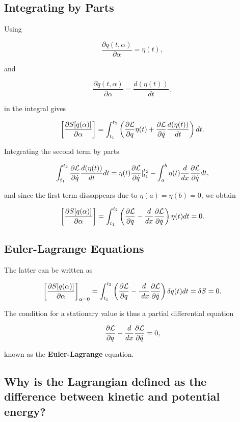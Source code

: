 \documentclass[%
oneside,                 %
final,                   %
10pt]{article}
\begin{document}
\subsection{Integrating by Parts}

Using

\[
\frac{\partial q(t,\alpha)}{\partial \alpha}=\eta(t),
\]

and

\[
\frac{\partial \dot{q}(t,\alpha)}{\partial \alpha}=\frac{d(\eta(t))}{dt},
\]

in the integral gives

\[
\left[\frac{\partial  S[q(\alpha)]}{\partial \alpha}\right]=\int_{t_1}^{t_2} \left( \frac{\partial {\cal L}}{\partial q}\eta(t)+\frac{\partial {\cal L}}{\partial \dot{q}}\frac{d(\eta(t))}{dt}\right)dt.
\]

Integrating the second term by parts

\[
\int_{t_1}^{t_2} \frac{\partial {\cal L}}{\partial \dot{q}}\frac{d(\eta(t))}{dt}dt =\eta(t)\frac{\partial {\cal L}}{\partial \dot{q}}|_{t_1}^{t_2}-
\int_a^b \eta(t)\frac{d}{dx}\frac{\partial {\cal L}}{\partial \dot{q}}dt,
\]

and since the first term dissappears due to $\eta(a)=\eta(b)=0$, we obtain

\[
\left[\frac{\partial  S[q(\alpha)]}{\partial \alpha}\right]=\int_{t_1}^{t_2} \left( \frac{\partial {\cal L}}{\partial q}-\frac{d}{dx}\frac{\partial {\cal L}}{\partial \dot{q}}
\right)\eta(t)dt=0.
\]

\subsection{Euler-Lagrange Equations}

The latter can be written as

\[
\left[\frac{\partial  S[q(\alpha)]}{\partial \alpha}\right]_{\alpha=0}=\int_{t_1}^{t_2} \left( \frac{\partial {\cal L}}{\partial q}-\frac{d}{\
dx}\frac{\partial {\cal L}}{\partial \dot{q}}\right)\delta q(t)dt=\delta S = 0.
\]

The condition for a stationary value is thus a partial differential equation

\[
\frac{\partial {\cal L}}{\partial q}-\frac{d}{dx}\frac{\partial {\cal L}}{\partial \dot{q}}=0,
\]

known as the \textbf{Euler-Lagrange} equation.

\subsection{Why is the Lagrangian defined as the difference between kinetic and potential energy?}
\end{document}
